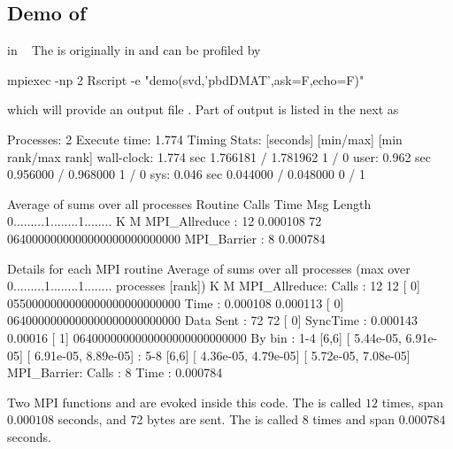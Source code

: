 \subsection{Demo of }

 in ~\citep{Schmidt2012pbdBASEpackage}
The  is originally in  and can be profiled
by
\begin{Code}
mpiexec -np 2 Rscript -e "demo(svd,'pbdDMAT',ask=F,echo=F)"
\end{Code}
which will provide an output file .
Part of output is listed in the next as
\begin{Output}
Processes:	2
Execute time:	1.774
Timing Stats: [seconds]	[min/max]    	[min rank/max rank]
  wall-clock: 1.774 sec	1.766181 / 1.781962	1 / 0
        user: 0.962 sec	0.956000 / 0.968000	1 / 0
         sys: 0.046 sec	0.044000 / 0.048000	0 / 1

                  Average of sums over all processes
Routine                 Calls       Time Msg Length    %
                                                    0.........1........1........
                                                              K        M
MPI_Allreduce       :      12   0.000108         72 0640000000000000000000000000
MPI_Barrier         :       8   0.000784

Details for each MPI routine
                  Average of sums over all processes
                                (max over          0.........1........1........
                                 processes [rank])           K        M
MPI_Allreduce:
	Calls     :         12           12 [   0] 0550000000000000000000000000
	Time      :   0.000108     0.000113 [   0] 0640000000000000000000000000
	Data Sent :         72           72 [   0]
	SyncTime  :   0.000143      0.00016 [   1] 0640000000000000000000000000
	By bin    : 1-4	[6,6]	[  5.44e-05,  6.91e-05]	[  6.91e-05,  8.89e-05]
	          : 5-8	[6,6]	[  4.36e-05,  4.79e-05]	[  5.72e-05,  7.08e-05]
MPI_Barrier:
	Calls     :          8
	Time      :   0.000784

\end{Output}
Two MPI  functions  and  are
evoked inside this  code. The  is called $12$
times, span $0.000108$ seconds, and 72 bytes are sent.
The  is called $8$ times and span $0.000784$ seconds.



